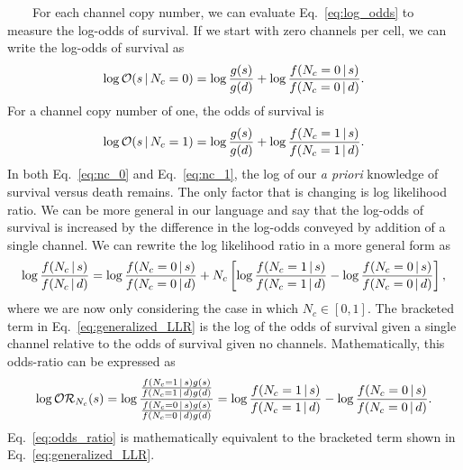 ~~~~For
each
channel
copy
number,
we can
evaluate
Eq.~\ref{eq:log_odds}
to
measure
the
log-odds
of
survival.
If we
start
with
zero
channels
per
cell,
we can
write
the
log-odds
of
survival
as
\begin{equation}
\log \mathcal{O}(s\,\vert\,N_c=0) = \log {g(s) \over g(d)} + \log {f(N_c=0\,\vert\, s) \over f(N_c=0\,\vert\, d)}.
\label{eq:nc_0}\end{equation}
For a
channel
copy
number
of
one,
the
odds
of
survival
is
\begin{equation}
\log \mathcal{O}(s\,\vert\,N_c=1) = \log{g(s) \over g(d)} + \log{f(N_c=1\,\vert\, s) \over f(N_c=1\,\vert\, d)}.
\label{eq:nc_1}\end{equation}
In
both
Eq.~\ref{eq:nc_0}
and
Eq.~\ref{eq:nc_1},
the
log of
our
\emph{a
priori}
knowledge
of
survival
versus
death
remains.
The
only
factor
that
is
changing
is log
likelihood
ratio.
We can
be
more
general
in our
language
and
say
that
the
log-odds
of
survival
is
increased
by the
difference
in the
log-odds
conveyed
by
addition
of a
single
channel.
We can
rewrite
the
log
likelihood
ratio
in a
more
general
form
as
\begin{equation}
\log {f(N_c\, \vert\, s) \over f(N_c\,\vert\, d)} = \log{f(N_c = 0\,\vert\,s) \over f(N_c=0\,\vert\, d)} + N_c \left[\log{f(N_c=1 \,\vert\,s) \over f(N_c=1\,\vert\, d)} - \log{f(N_c=0\,\vert\, s) \over f(N_c=0\,\vert\, d)}\right],
\label{eq:generalized_LLR}\end{equation}
where
we are
now
only
considering
the
case
in
which
\(N_c \in [0, 1]\).
The
bracketed
term
in
Eq.~\ref{eq:generalized_LLR}
is the
log of
the
odds
of
survival
given
a
single
channel
relative
to the
odds
of
survival
given
no
channels.
Mathematically,
this
odds-ratio
can be
expressed
as
\begin{equation}
\log\mathcal{OR}_{N_c}(s) = \log{{f(N_c=1\,\vert\,s)g(s)\over f(N_c=1\,\vert\,d)g(d)}\over {f(N_c=0\,\vert\,s)g(s)\over f(N_c=0\,\vert\,d)g(d)}} = \log{f(N_c=1\,\vert\,s) \over f(N_c=1\,\vert\,d)} - \log{f(N_c=0\,\vert\,s)\over f(N_c=0\,\vert\,d)} .
\label{eq:odds_ratio}\end{equation}
Eq.~\ref{eq:odds_ratio}
is
mathematically
equivalent
to the
bracketed
term
shown
in
Eq.~\ref{eq:generalized_LLR}.

